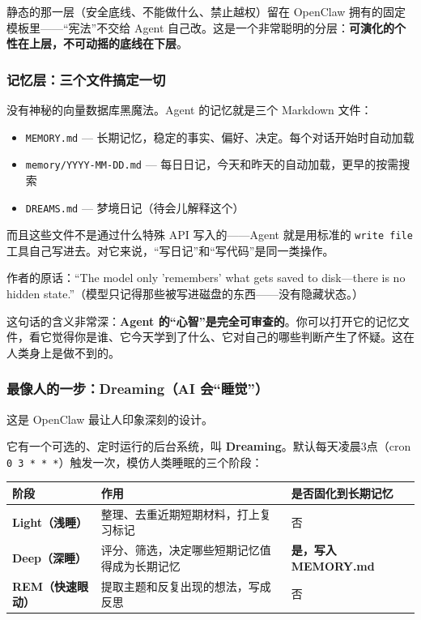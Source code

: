 \documentclass[11pt,a4paper]{ctexart}
\begin{document}
静态的那一层（安全底线、不能做什么、禁止越权）留在 OpenClaw 拥有的固定模板里——“宪法”不交给 Agent 自己改。这是一个非常聪明的分层：\textbf{可演化的个性在上层，不可动摇的底线在下层}。

\subsubsection{记忆层：三个文件搞定一切}

没有神秘的向量数据库黑魔法。Agent 的记忆就是三个 Markdown 文件：

\begin{itemize}
  \item \texttt{MEMORY.md} — 长期记忆，稳定的事实、偏好、决定。每个对话开始时自动加载
  \item \texttt{memory/YYYY-MM-DD.md} — 每日日记，今天和昨天的自动加载，更早的按需搜索
  \item \texttt{DREAMS.md} — 梦境日记（待会儿解释这个）
\end{itemize}

而且这些文件不是通过什么特殊 API 写入的——Agent 就是用标准的 \texttt{write file} 工具自己写进去。对它来说，“写日记”和“写代码”是同一类操作。

作者的原话：“The model only 'remembers' what gets saved to disk—there is no hidden state.”（模型只记得那些被写进磁盘的东西——没有隐藏状态。）

这句话的含义非常深：\textbf{Agent 的“心智”是完全可审查的}。你可以打开它的记忆文件，看它觉得你是谁、它今天学到了什么、它对自己的哪些判断产生了怀疑。这在人类身上是做不到的。

\subsubsection{最像人的一步：Dreaming（AI 会“睡觉”）}

这是 OpenClaw 最让人印象深刻的设计。

它有一个可选的、定时运行的后台系统，叫 \textbf{Dreaming}。默认每天凌晨3点（cron \texttt{0 3 * * *}）触发一次，模仿人类睡眠的三个阶段：

\begin{center}

\begin{tabularx}{\textwidth}{lXX}
\toprule
阶段 & 作用 & 是否固化到长期记忆 \\
\midrule
\textbf{Light（浅睡）} & 整理、去重近期短期材料，打上复习标记 & 否 \\
\textbf{Deep（深睡）} & 评分、筛选，决定哪些短期记忆值得成为长期记忆 & \textbf{是，写入 MEMORY.md} \\
\textbf{REM（快速眼动）} & 提取主题和反复出现的想法，写成反思 & 否 \\
\bottomrule
\end{tabularx}
\end{center}
\end{document}
